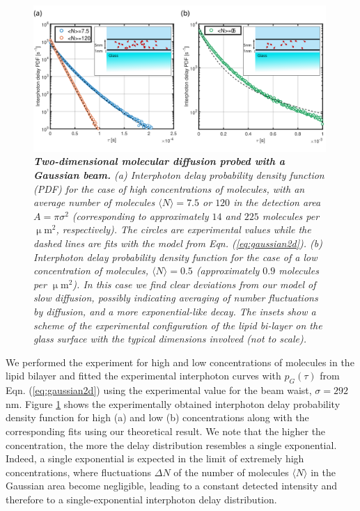 \begin{figure}
\includegraphics[width=0.99\textwidth]{03_Figure_3_2D_gaussian_with_single}%
\caption{\textit{\textbf{Two-dimensional molecular diffusion probed with a Gaussian beam.} 
(a) Interphoton delay probability density function (PDF) for the case 
of high concentrations of molecules, with an average
number of molecules $\langle N \rangle=7.5$ or $120$ in the detection area 
$A=\pi\sigma^2$ (corresponding to approximately $14$ and $225$ molecules 
per $\upmu\mbox{m}^2$, respectively). The circles are experimental values 
while the dashed lines are fits with the model from Eqn. (\ref{eq:gaussian2d}). 
(b) Interphoton delay probability density function for the case of a low concentration
of molecules, $\langle N \rangle=0.5$ (approximately $0.9$ molecules per $\upmu\mbox{m}^2$). 
In this case we find clear deviations from our model of slow diffusion, possibly indicating averaging of number fluctuations by diffusion, and a more exponential-like decay. The insets show a scheme of the experimental configuration of the lipid bi-layer on the glass surface with the typical dimensions involved (not to scale).
\label{fg:gaussian2d}}}
\end{figure}

We performed the experiment for high and low concentrations 
of molecules in the lipid bilayer and fitted 
the experimental interphoton curves with $p_{G}(\tau)$ from 
Eqn. (\ref{eq:gaussian2d}) using the experimental value for the beam 
waist, $\sigma=292$ nm. Figure \ref{fg:gaussian2d} shows the experimentally 
obtained interphoton delay probability density function for high (a) and 
low (b) concentrations along with the corresponding fits using our theoretical result. 
We note that the higher the concentration, the more the delay distribution 
resembles a single exponential. Indeed, a single exponential is expected in 
the limit of extremely high concentrations, where fluctuations $\Delta N$ 
of the number of molecules $\langle N \rangle$ in the Gaussian area become 
negligible, leading to a constant detected intensity and therefore to a single-exponential 
interphoton delay distribution.

